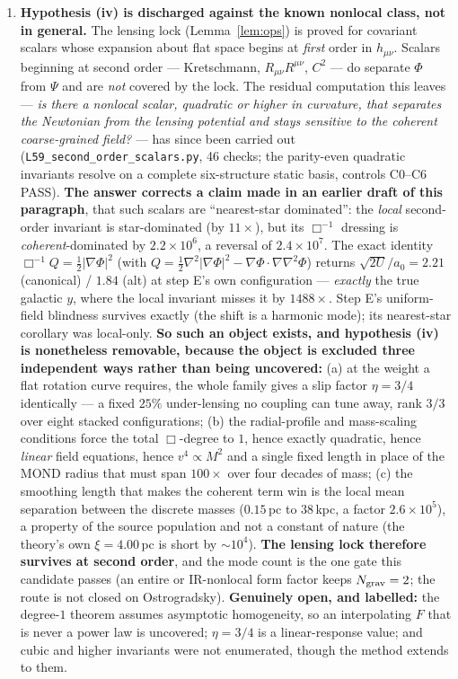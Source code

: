 \documentclass[11pt,letterpaper]{article}
\newcommand{\dal}{\Box}
\begin{document}
\begin{enumerate}
\item \textbf{Hypothesis (iv) is discharged against the known nonlocal class, not in general.} The lensing lock (Lemma~\ref{lem:ops}) is proved for covariant scalars whose expansion about flat space begins at \emph{first} order in $h_{\mu\nu}$. Scalars beginning at second order --- Kretschmann, $R_{\mu\nu}R^{\mu\nu}$, $C^2$ --- do separate $\Phi$ from $\Psi$ and are \emph{not} covered by the lock. The residual computation this leaves --- \emph{is there a nonlocal scalar, quadratic or higher in curvature, that separates the Newtonian from the lensing potential and stays sensitive to the coherent coarse-grained field?} --- has since been carried out (\texttt{L59\_second\_order\_scalars.py}, 46 checks; the parity-even quadratic invariants resolve on a complete six-structure static basis, controls C0--C6 PASS). \textbf{The answer corrects a claim made in an earlier draft of this paragraph}, that such scalars are ``nearest-star dominated'': the \emph{local} second-order invariant is star-dominated (by $11\times$), but its $\dal^{-1}$ dressing is \emph{coherent}-dominated by $2.2\times10^{6}$, a reversal of $2.4\times10^{7}$. The exact identity $\dal^{-1}Q=\tfrac12|\nabla\Phi|^2$ (with $Q=\tfrac12\nabla^2|\nabla\Phi|^2-\nabla\Phi\cdot\nabla\nabla^2\Phi$) returns $\sqrt{2U}/a_0=2.21$ (canonical) / $1.84$ (alt) at step E's own configuration --- \emph{exactly} the true galactic $y$, where the local invariant misses it by $1488\times$. Step E's uniform-field blindness survives exactly (the shift is a harmonic mode); its nearest-star corollary was local-only. \textbf{So such an object exists, and hypothesis (iv) is nonetheless removable, because the object is excluded three independent ways rather than being uncovered:} (a) at the weight a flat rotation curve requires, the whole family gives a slip factor $\eta=3/4$ identically --- a fixed $25\%$ under-lensing no coupling can tune away, rank $3/3$ over eight stacked configurations; (b) the radial-profile and mass-scaling conditions force the total $\dal$-degree to $1$, hence exactly quadratic, hence \emph{linear} field equations, hence $v^4\propto M^2$ and a single fixed length in place of the MOND radius that must span $100\times$ over four decades of mass; (c) the smoothing length that makes the coherent term win is the local mean separation between the discrete masses ($0.15$\,pc to $38$\,kpc, a factor $2.6\times10^{5}$), a property of the source population and not a constant of nature (the theory's own $\xi=4.00$\,pc is short by $\sim10^{4}$). \textbf{The lensing lock therefore survives at second order}, and the mode count is the one gate this candidate passes (an entire or IR-nonlocal form factor keeps $N_{\rm grav}=2$; the route is not closed on Ostrogradsky). \textbf{Genuinely open, and labelled:} the degree-$1$ theorem assumes asymptotic homogeneity, so an interpolating $F$ that is never a power law is uncovered; $\eta=3/4$ is a linear-response value; and cubic and higher invariants were not enumerated, though the method extends to them.

\end{enumerate}
\end{document}
